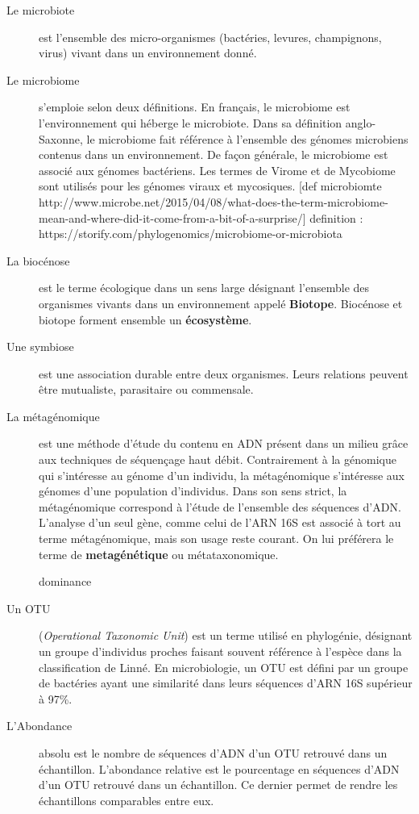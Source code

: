 \documentclass[12pt,a4paper]{article}
\begin{document}
\begin{description}
  \item[Le microbiote] est l’ensemble des micro-organismes (bactéries, levures, champignons, virus) vivant dans un environnement donné.
  
\item[Le microbiome] s’emploie selon deux définitions. En français, le microbiome est l'environnement qui héberge le microbiote. Dans sa définition anglo-Saxonne, le microbiome fait référence à l’ensemble des génomes microbiens contenus dans un environnement. 
De façon générale, le microbiome est associé aux génomes bactériens. Les termes de Virome et de Mycobiome sont utilisés pour les génomes viraux et mycosiques. 
[def microbiomte http://www.microbe.net/2015/04/08/what-does-the-term-microbiome-mean-and-where-did-it-come-from-a-bit-of-a-surprise/]
definition : https://storify.com/phylogenomics/microbiome-or-microbiota
\item[La biocénose] est le terme écologique dans un sens large désignant l'ensemble des organismes vivants dans un environnement appelé \textbf{Biotope}. Biocénose et biotope forment ensemble un \textbf{écosystème}.

\item[Une symbiose] est une association durable entre deux organismes. Leurs relations peuvent être mutualiste, parasitaire ou commensale.

\item[La métagénomique] est une méthode d’étude du contenu en ADN présent dans un milieu grâce aux techniques de séquençage haut débit. Contrairement à la génomique qui s’intéresse au génome d’un individu, la métagénomique s’intéresse aux génomes d’une population d’individus.
Dans son sens strict, la métagénomique correspond à l’étude de l’ensemble des séquences d'ADN. L’analyse d’un seul gène, comme celui de l’ARN 16S est associé à tort au terme métagénomique, mais son usage reste courant. On lui préférera le terme de \textbf{metagénétique} ou métataxonomique.

dominance

\item[Un OTU] (\textit{Operational Taxonomic Unit}) est un terme utilisé en phylogénie, désignant un groupe d’individus proches faisant souvent référence à l’espèce dans la classification de Linné.
En microbiologie, un OTU est défini par un groupe de bactéries ayant une similarité dans leurs séquences d'ARN 16S supérieur à 97\%.

\item[L'Abondance] absolu est le nombre de séquences d'ADN d'un OTU retrouvé dans un échantillon. 
L’abondance relative est le pourcentage en séquences d'ADN d'un OTU retrouvé dans un échantillon. Ce dernier permet de rendre les échantillons comparables entre eux.


\end{description}
\end{document}
